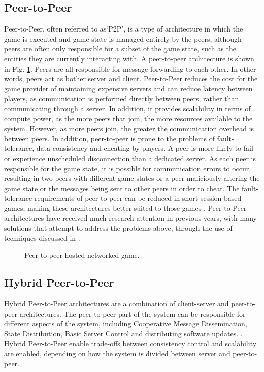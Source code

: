 \subsection{Peer-to-Peer}
Peer-to-Peer, often referred to as`P2P', is a type of architecture in which the game is executed and game state is managed entirely by the peers, although peers are often only responsible for a subset of the game state, such as the entities they are currently interacting with. A peer-to-peer architecture is shown in Fig. \ref{fig_P2P}. Peers are all responsible for message forwarding to each other. In other words, peers act as bother server and client. Peer-to-Peer reduces the cost for the game provider of maintaining expensive servers and can reduce latency between players, as communication is performed directly between peers, rather than communicating through a server. In addition, it provides scalability in terms of compute power, as the more peers that join, the more resources available to the system. However, as more peers join, the greater the communication overhead is between peers. In addition, peer-to-peer is prone to the problems of fault-tolerance, data consistency and cheating by players. A peer is more likely to fail or experience unscheduled disconnection than a dedicated server. As each peer is responsible for the game state, it is possible for communication errors to occur, resulting in two peers with different game states or a peer maliciously altering the game state or the messages being sent to other peers in order to cheat. The fault-tolerance requirements of peer-to-peer can be reduced in short-session-based games, making these architectures better suited to those games \cite{P2PSurvey}. Peer-to-Peer architectures have received much research attention in previous years, with many solutions that attempt to address the problems above, through the use of techniques discussed in \cite{P2PSurvey}.


\begin{figure}
	\centering
	
	\caption{Peer-to-peer hosted networked game.}
	\label{fig_P2P}
\end{figure}

\subsection{Hybrid Peer-to-Peer}
Hybrid Peer-to-Peer architectures are a combination of client-server and peer-to-peer architectures. The peer-to-peer part of the system can be responsible for different aspects of the system, including Cooperative Message Dissemination, State Distribution, Basic Server Control and distributing software updates. \cite{P2PSurvey}. Hybrid Peer-to-Peer enable trade-offs between consistency control and scalability are enabled, depending on how the system is divided between server and peer-to-peer.

